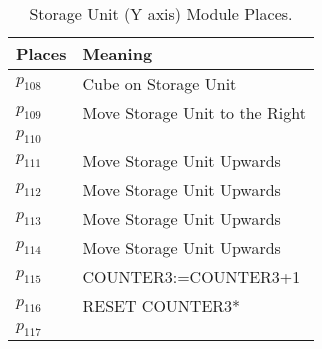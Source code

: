 \begin{table}[H]
\caption{Storage Unit (Y axis) Module Places.}
\centering
\begin{tabular}{M{5cm}M{10cm}}
Places & Meaning\\
\hline
\hyperlink{partialNet:p1081}{\hypertarget{partialTable:p108}{$p_{108}$}} & Cube on Storage Unit\\
\hyperlink{partialNet:p1091}{\hypertarget{partialTable:p109}{$p_{109}$}} & Move Storage Unit to the Right\\
\hyperlink{partialNet:p1101}{\hypertarget{partialTable:p110}{$p_{110}$}} & \\
\hyperlink{partialNet:p1111}{\hypertarget{partialTable:p111}{$p_{111}$}} & Move Storage Unit Upwards\\
\hyperlink{partialNet:p1121}{\hypertarget{partialTable:p112}{$p_{112}$}} & Move Storage Unit Upwards\\
\hyperlink{partialNet:p1131}{\hypertarget{partialTable:p113}{$p_{113}$}} & Move Storage Unit Upwards\\
\hyperlink{partialNet:p1141}{\hypertarget{partialTable:p114}{$p_{114}$}} & Move Storage Unit Upwards\\
\hyperlink{partialNet:p1151}{\hypertarget{partialTable:p115}{$p_{115}$}} & COUNTER3:=COUNTER3+1\\
\hyperlink{partialNet:p1161}{\hypertarget{partialTable:p116}{$p_{116}$}} & RESET COUNTER3*\\
\hyperlink{partialNet:p1171}{\hypertarget{partialTable:p117}{$p_{117}$}} & \\
\end{tabular}
\end{table}
